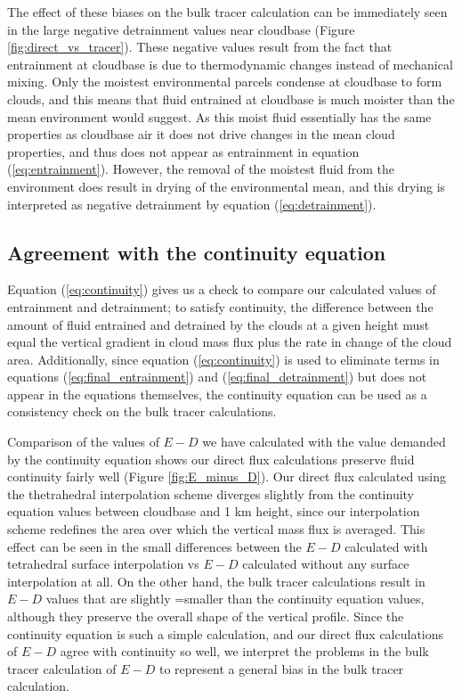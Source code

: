\documentclass[12pt]{article}
\begin{document}
The effect of these biases on the bulk tracer calculation can be immediately 
seen in the large negative detrainment values near cloudbase (Figure 
\ref{fig:direct_vs_tracer}).  These negative values result from the fact that
entrainment at cloudbase is due to thermodynamic changes instead of mechanical 
mixing.  Only the moistest environmental parcels condense at cloudbase to form 
clouds, and this means that fluid entrained at cloudbase is much moister than 
the mean environment would suggest.  As this moist fluid essentially has the 
same properties as cloudbase air it does not drive changes in the mean cloud 
properties, and thus does not appear as entrainment in equation 
(\ref{eq:entrainment}).  However, the removal of the moistest fluid from the 
environment does result in drying of the environmental mean, and this drying is 
interpreted as negative detrainment by equation (\ref{eq:detrainment}).


\subsection{Agreement with the continuity equation}

Equation (\ref{eq:continuity}) gives us a check to compare our calculated 
values of entrainment and detrainment; to satisfy continuity, the difference 
between the amount of fluid entrained and detrained by the clouds at a given 
height must equal the vertical gradient in cloud mass flux plus the rate in 
change of the cloud area.  Additionally, since equation (\ref{eq:continuity}) 
is used to eliminate terms in equations (\ref{eq:final_entrainment}) and 
(\ref{eq:final_detrainment}) but does not appear in the equations themselves, 
the continuity equation can be used as a consistency check on the bulk tracer 
calculations.

Comparison of the values of $E-D$ we have calculated with the value demanded by 
the continuity equation shows our direct flux calculations preserve fluid 
continuity fairly well (Figure \ref{fig:E_minus_D}).  Our direct flux 
calculated using the thetrahedral interpolation scheme diverges slightly from
the continuity equation values between cloudbase and 1 km height, since our 
interpolation scheme redefines the area over which the vertical mass flux is 
averaged.  This effect can be seen in the small differences between the $E-D$ 
calculated with tetrahedral surface interpolation vs $E-D$ calculated without 
any surface interpolation at all.  On the other hand, the bulk tracer 
calculations result in $E-D$ values that are slightly =smaller than the 
continuity equation values, although they preserve the overall shape of the 
vertical profile.  Since the continuity equation is such a simple calculation, 
and our direct flux calculations of $E-D$ agree with continuity so well, we 
interpret the problems in the bulk tracer calculation of $E-D$ to represent a 
general bias in the bulk tracer calculation.
\end{document}
